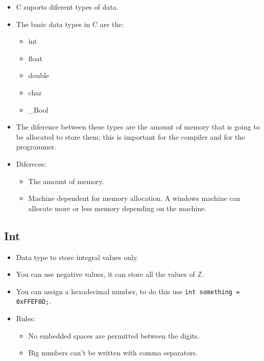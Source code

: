 \begin{itemize}
    \item C suports diferent types of data.
    \item The basic data types in C are the:
        \begin{itemize}
            \item int 
            \item float 
            \item double 
            \item char 
            \item \_Bool
        \end{itemize}
    
    \item The diference between these types are the amount of memory that is going to be allocated to store them; this is important for the compiler and for the programmer.
    \item Difereces:
        \begin{itemize}
            \item The amount of memory.
            \item Machine dependent for memory allocation. A windows machine can allocate more or less memory depending on the machine.
        \end{itemize}
\end{itemize}
\subsection{Int}
\begin{itemize}
    \item Data type to store integral values only.
    \item You can use negative values, it can store all the values of $\mathbb{Z}$.
    \item You can assign a hexadecimal number, to do this use \verb|int something = 0xFFEF0D;|.
    \item Rules:
        \begin{itemize}
            \item No embedded spaces are permitted between the digits.
            \item Big numbers can't be written with comma separators.
        \end{itemize}
\end{itemize}
